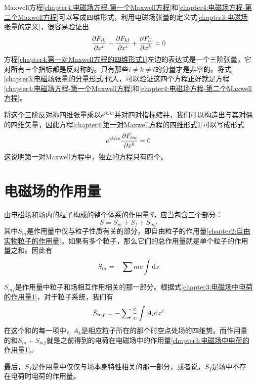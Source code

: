 Maxwell方程\eqref{chapter4:电磁场方程-第一个Maxwell方程}和\eqref{chapter4:电磁场方程-第二个Maxwell方程}可以写成四维形式，利用电磁场张量的定义式\eqref{chapter3:电磁场张量的定义}，很容易验证出
\begin{equation}
	\frac{\partial F_{ik}}{\partial x^l} + \frac{\partial F_{kl}}{\partial x^i} + \frac{\partial F_{li}}{\partial x^k} = 0
	\label{chapter4:第一对Maxwell方程的四维形式1}
\end{equation}
方程\eqref{chapter4:第一对Maxwell方程的四维形式1}左边的表达式是一个三阶张量，它对所有三个指标都是反对称的。只有那些$i\neq k\neq l$的分量才是非零的。将式\eqref{chapter3:电磁场张量的分量形式}代入，可以验证这四个方程正好就是方程\eqref{chapter4:电磁场方程-第一个Maxwell方程}和\eqref{chapter4:电磁场方程-第二个Maxwell方程}。

将这个三阶反对称四维张量乘以$e^{iklm}$并对四对指标缩并，我们可以构造出与其对偶的四维矢量，因此方程\eqref{chapter4:第一对Maxwell方程的四维形式1}可以写成形式
\begin{equation}
	e^{iklm}\frac{\partial F_{lm}}{\partial x^k} = 0
	\label{chapter4:第一对Maxwell方程的四维形式2}
\end{equation}
这说明第一对Maxwell方程中，独立的方程只有四个。

\section{电磁场的作用量}

由电磁场和场内的粒子构成的整个体系的作用量$S$，应当包含三个部分：
\begin{equation}
	S = S_m+S_f+S_{mf}
\end{equation}
其中$S_m$是作用量中仅与粒子性质有关的部分，即自由粒子的作用量\eqref{chapter2:自由实物粒子的作用量}。如果有多个粒子，那么它们的总作用量就是单个粒子的作用量之和。因此有
\begin{equation}
	S_m = -\sum mc\int \mathrm{d} s
	\label{chapter4:电磁场作用量中粒子的部分}
\end{equation}

$S_{mf}$是作用量中粒子和场相互作用相关的那一部分。根据式\eqref{chapter3:电磁场中电荷的作用量1}，对于粒子系统，我们有
\begin{equation}
	S_{mf} = -\sum \frac{e}{c}\int A_i\mathrm{d} x^i
	\label{chapter4:电磁场作用量中粒子与场相互作用的部分}
\end{equation}
在这个和的每一项中，$A_k$是相应粒子所在的那个时空点处场的四维势。而作用量的和$S_m+S_{mf}$就是之前得到的电荷在电磁场中的作用量\eqref{chapter3:电磁场中电荷的作用量1}。

最后，$S_f$是作用量中仅仅与场本身特性相关的那一部分，或者说，$S_f$是场中不存在电荷时电荷的作用量。

